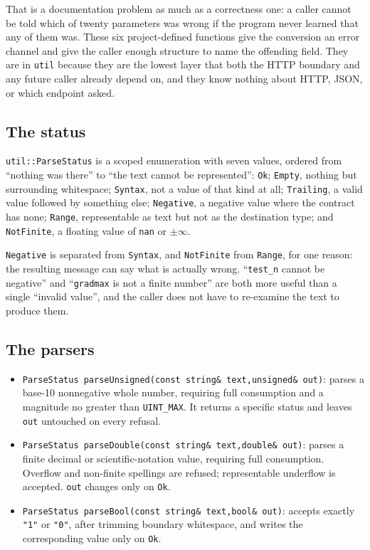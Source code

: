 That is a documentation problem as much as a correctness one: a caller cannot
be told which of twenty parameters was wrong if the program never learned that
any of them was.  These six project-defined functions give the conversion an
error channel and give the caller enough structure to name the offending field.
They are in \texttt{util} because they are the lowest layer that both the HTTP
boundary and any future caller already depend on, and they know nothing about
HTTP, JSON, or which endpoint asked.

\subsection{The status}

\texttt{util::ParseStatus} is a scoped enumeration with seven values, ordered
from ``nothing was there'' to ``the text cannot be represented'':
\texttt{Ok}; \texttt{Empty}, nothing but surrounding whitespace;
\texttt{Syntax}, not a value of that kind at all; \texttt{Trailing}, a valid
value followed by something else; \texttt{Negative}, a negative value where the
contract has none; \texttt{Range}, representable as text but not as the
destination type; and \texttt{NotFinite}, a floating value of
\texttt{nan} or $\pm\infty$.

\texttt{Negative} is separated from \texttt{Syntax}, and \texttt{NotFinite}
from \texttt{Range}, for one reason: the resulting message can say what is
actually wrong.  ``\texttt{test\_n} cannot be negative'' and
``\texttt{gradmax} is not a finite number'' are both more useful than a single
``invalid value'', and the caller does not have to re-examine the text to
produce them.

\subsection{The parsers}

\begin{itemize}
\item \texttt{ParseStatus parseUnsigned(const string\& text,unsigned\& out)}:
      parses a base-10 nonnegative whole number, requiring full consumption and
      a magnitude no greater than \texttt{UINT\_MAX}.  It returns a specific
      status and leaves \texttt{out} untouched on every refusal.
\item \texttt{ParseStatus parseDouble(const string\& text,double\& out)}:
      parses a finite decimal or scientific-notation value, requiring full
      consumption.  Overflow and non-finite spellings are refused; representable
      underflow is accepted.  \texttt{out} changes only on \texttt{Ok}.
\item \texttt{ParseStatus parseBool(const string\& text,bool\& out)}:
      accepts exactly \texttt{"1"} or \texttt{"0"}, after trimming boundary
      whitespace, and writes the corresponding value only on \texttt{Ok}.
\end{itemize}

